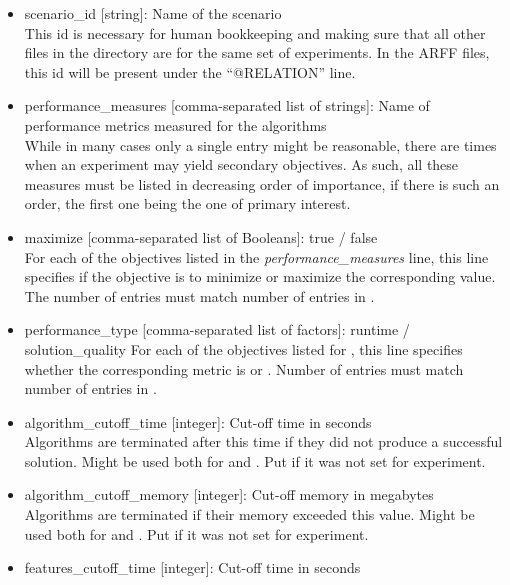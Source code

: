 \begin{itemize}
	\item scenario\_id [string]: Name of the scenario\\ 
		This id is necessary for human bookkeeping and making sure that all
		other files in the directory are for the same set of experiments. In the ARFF files, this id will be present 
		under the ``@RELATION'' line.
  	\item performance\_measures [comma-separated list of strings]: Name of performance metrics measured for 
		the algorithms\\
		While in many cases only a single entry might be reasonable, there are times when an 
		experiment may yield secondary objectives. As such, all these measures must be listed in decreasing 
		order of importance, if there is such an order, the first one being the one of primary interest.
  	\item maximize [comma-separated list of Booleans]: true / false\\ 
  	    For each of the objectives listed in the \textit{performance\_measures} line,
		this line specifies if the objective is to minimize or maximize the corresponding value. The number of entries 
		must match number of entries in .
  	\item performance\_type [comma-separated list of factors]: runtime / solution\_quality
  	    For each of the objectives listed for ,
		this line specifies whether the corresponding metric is 
		or . Number of entries must match number of entries in 
		.
 	\item algorithm\_cutoff\_time [integer]: Cut-off time in seconds\\ 
 	    Algorithms are terminated after this time if they did 
		not produce a successful solution. Might be used both for  and .
  	      	Put \qm if it was not set for experiment.
  	\item algorithm\_cutoff\_memory [integer]: Cut-off memory in megabytes\\
  	    Algorithms are terminated if their memory
		exceeded this value. Might be used both for  and . Put \qm if it 
		was not set for experiment. 
  	\item features\_cutoff\_time [integer]: Cut-off time in seconds\\

\end{itemize}
